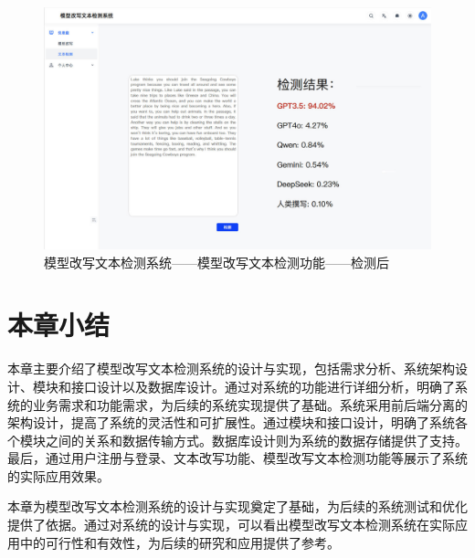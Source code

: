 \begin{figure}[htb]
    \centering
    \includegraphics[width=\textwidth]{figures/sys-detect2.jpg}
    \caption{模型改写文本检测系统——模型改写文本检测功能——检测后}
    \label{fig:sys-detect2}
\end{figure}

\section{本章小结}
\label{sec:sys-conclusion}

本章主要介绍了模型改写文本检测系统的设计与实现，包括需求分析、系统架构设计、模块和接口设计以及数据库设计。通过对系统的功能进行详细分析，明确了系统的业务需求和功能需求，为后续的系统实现提供了基础。系统采用前后端分离的架构设计，提高了系统的灵活性和可扩展性。通过模块和接口设计，明确了系统各个模块之间的关系和数据传输方式。数据库设计则为系统的数据存储提供了支持。最后，通过用户注册与登录、文本改写功能、模型改写文本检测功能等展示了系统的实际应用效果。

本章为模型改写文本检测系统的设计与实现奠定了基础，为后续的系统测试和优化提供了依据。通过对系统的设计与实现，可以看出模型改写文本检测系统在实际应用中的可行性和有效性，为后续的研究和应用提供了参考。